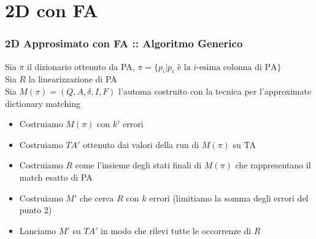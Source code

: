 \documentclass{beamer}
\begin{document}
\section{2D con FA}
\begin{frame}
\frametitle{2D Approsimato con FA :: Algoritmo Generico}
\begin{definition}
	Sia $\pi$ il dizionario ottenuto da PA, $\pi= \{p_i | p_i \text{ è la } i \text{-esima colonna di PA}\}$\\
	Sia $R$ la linearizzazione di PA\\
	Sia $M(\pi) = (Q,A,\delta,I,F)$ l'automa costruito con la tecnica per l'approximate dictionary matching\\
\end{definition}
\begin{itemize}
\item Costruiamo $M(\pi)$ con $k'$ errori 
\item Costruiamo $TA'$ ottenuto dai valori della run di $M(\pi)$ su TA
\item Costruiamo $R$ come l'insieme degli stati finali di $M(\pi)$ che rappresentano il match esatto di PA
\item Costruiamo $M'$ che cerca $R$ con $k$ errori (limitiamo la somma degli errori del punto 2)
\item Lanciamo $M'$ su $TA'$ in modo che rilevi tutte le occorrenze di $R$
\end{itemize}

\end{frame}
\begin{frame}


\end{frame}
\end{document}
